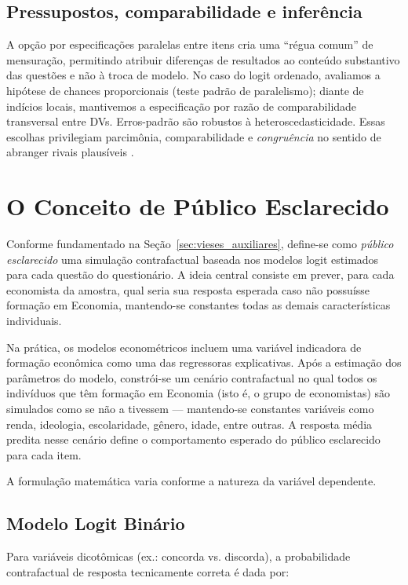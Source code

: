 \subsection{Pressupostos, comparabilidade e inferência}
A opção por especificações paralelas entre itens cria uma “régua comum” de mensuração, permitindo atribuir diferenças de resultados ao conteúdo substantivo das questões e não à troca de modelo. No caso do logit ordenado, avaliamos a hipótese de chances proporcionais (teste padrão de paralelismo); diante de indícios locais, mantivemos a especificação por razão de comparabilidade transversal entre DVs. Erros-padrão são robustos à heteroscedasticidade. Essas escolhas privilegiam parcimônia, comparabilidade e \textit{congruência} no sentido de abranger rivais plausíveis \cite{stigum2003}.


\section{O Conceito de Público Esclarecido}

Conforme fundamentado na Seção~\ref{sec:vieses_auxiliares}, define-se como \textit{público esclarecido} uma simulação contrafactual baseada nos modelos logit estimados para cada questão do questionário. A ideia central consiste em prever, para cada economista da amostra, qual seria sua resposta esperada caso não possuísse formação em Economia, mantendo-se constantes todas as demais características individuais.

Na prática, os modelos econométricos incluem uma variável indicadora de formação econômica como uma das regressoras explicativas. Após a estimação dos parâmetros do modelo, constrói-se um cenário contrafactual no qual todos os indivíduos que têm formação em Economia (isto é, o grupo de economistas) são simulados como se não a tivessem — mantendo-se constantes variáveis como renda, ideologia, escolaridade, gênero, idade, entre outras. A resposta média predita nesse cenário define o comportamento esperado do público esclarecido para cada item.

A formulação matemática varia conforme a natureza da variável dependente.

\subsection{Modelo Logit Binário}

Para variáveis dicotômicas (ex.: concorda vs. discorda), a probabilidade contrafactual de resposta tecnicamente correta é dada por:

